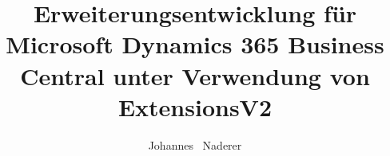 \documentclass[bachelor,german]{hgbthesis}
\title{	Erweiterungsentwicklung für Microsoft Dynamics 365 Business Central unter Verwendung von ExtensionsV2}
\author{Johannes \ Naderer}
\begin{document}




	
	
\frontmatter                    %

\tableofcontents

\mainmatter          %









\MakeBibliography                        %

\end{document}
